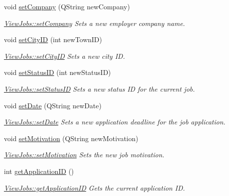 \begin{DoxyCompactItemize}
void \mbox{\hyperlink{class_view_jobs_a596246d07be66a5aeaf14ff8e5649290}{set\+Company}} (Q\+String new\+Company)
\begin{DoxyCompactList}\small\item\em \mbox{\hyperlink{class_view_jobs_a596246d07be66a5aeaf14ff8e5649290}{View\+Jobs\+::set\+Company}} Sets a new employer company name. \end{DoxyCompactList}\item 
void \mbox{\hyperlink{class_view_jobs_ad89218b37af85cac9ce6c346efb57e56}{set\+City\+ID}} (int new\+Town\+ID)
\begin{DoxyCompactList}\small\item\em \mbox{\hyperlink{class_view_jobs_ad89218b37af85cac9ce6c346efb57e56}{View\+Jobs\+::set\+City\+ID}} Sets a new city ID. \end{DoxyCompactList}\item 
void \mbox{\hyperlink{class_view_jobs_a55943415fd91377d5f701f7074ba58d6}{set\+Status\+ID}} (int new\+Status\+ID)
\begin{DoxyCompactList}\small\item\em \mbox{\hyperlink{class_view_jobs_a55943415fd91377d5f701f7074ba58d6}{View\+Jobs\+::set\+Status\+ID}} Sets a new status ID for the current job. \end{DoxyCompactList}\item 
void \mbox{\hyperlink{class_view_jobs_a7574794410eb40956f343976de97221f}{set\+Date}} (Q\+String new\+Date)
\begin{DoxyCompactList}\small\item\em \mbox{\hyperlink{class_view_jobs_a7574794410eb40956f343976de97221f}{View\+Jobs\+::set\+Date}} Sets a new application deadline for the job application. \end{DoxyCompactList}\item 
void \mbox{\hyperlink{class_view_jobs_a53bdfabaf2b442841d676f42ebbf975f}{set\+Motivation}} (Q\+String new\+Motivation)
\begin{DoxyCompactList}\small\item\em \mbox{\hyperlink{class_view_jobs_a53bdfabaf2b442841d676f42ebbf975f}{View\+Jobs\+::set\+Motivation}} Sets the new job motivation. \end{DoxyCompactList}\item 
int \mbox{\hyperlink{class_view_jobs_a086650882ad80acb4074cf697f8cddcb}{get\+Application\+ID}} ()
\begin{DoxyCompactList}\small\item\em \mbox{\hyperlink{class_view_jobs_a086650882ad80acb4074cf697f8cddcb}{View\+Jobs\+::get\+Application\+ID}} Gets the current application ID. \end{DoxyCompactList}\item 

\end{DoxyCompactItemize}
